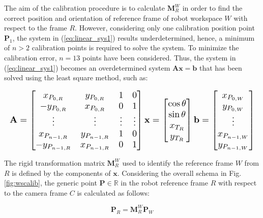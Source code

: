 \documentclass[a4paper, 10 pt, conference]{ieeeconf}      %
\begin{document}
The aim of the calibration procedure is to calculate $\mathbf{M}^W_{R}$ in order to find the correct position and orientation of reference frame of robot workspace $W$ with respect to the frame $R$. However, considering only one calibration position point $\mathbf{P}_1$, the system in (\ref{eq:linear_sys1}) results underdetermined, hence, a minimum of $n>2$ calibration points is required to solve the system. To minimize the calibration error, $n=13$ points have been considered. Thus, the system in (\ref{eq:linear_sys1}) becomes an overdetermined system $\mathbf{A}\mathbf{x}=\mathbf{b}$ that has been solved using the least square method, such as:

\begin{equation}\label{eq:linear_sys2}
\resizebox{\columnwidth}{!}{$%
	\begin{gathered}
	\mathbf{A} =   \begin{bmatrix}
	x_{P_{0,R}} & y_{P_{0,R}} & 1 & 0\\
	-y_{P_{0,R}} & x_{P_{0,R}} & 0 & 1 \\
	\vdots & \vdots & \vdots & \vdots\\
	x_{P_{n-1,R}} & y_{P_{n-1,R}} & 1 & 0\\
	-y_{P_{n-1,R}} & x_{P_{n-1,R}} & 0 & 1 
	\end{bmatrix}
	\mathbf{x} =   \begin{bmatrix}
	\cos\theta\\
	\sin\theta\\
	x_{T_R}\\
	y_{T_R}
	\end{bmatrix}
	\mathbf{b} =   \begin{bmatrix}
	x_{P_{0,W}}\\
	y_{P_{0,W}}\\
	\vdots\\
	x_{P_{n-1,W}}\\
	y_{P_{n-1,W}}\\
	\end{bmatrix}
	\end{gathered}
	$%
}%
\end{equation}

The rigid transformation matrix $\mathbf{M}^W_{R}$ used to identify the reference frame $W$ from $R$ is defined by the components of $\mathbf{x}$.
Considering the overall schema in Fig. \ref{fig:wscalib}, the generic point $\mathbf{P}\in\mathbb{R}$ in the robot reference frame $R$ with respect to the camera frame $C$ is calculated as follows:

\begin{equation}\label{eq:roto1}
\mathbf{P}_{R} = \mathbf{M}^W_{R}\mathbf{P}_{W}
\end{equation}
\end{document}
